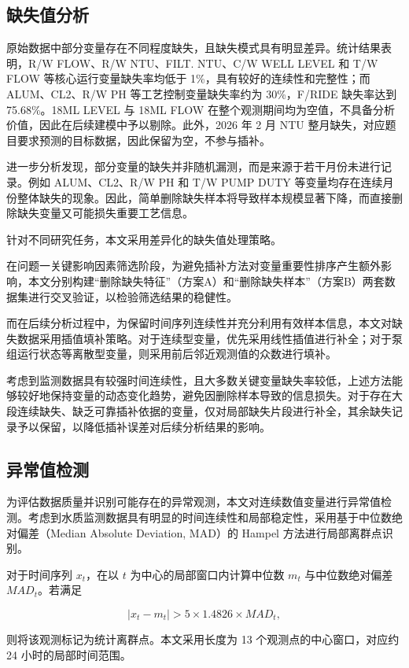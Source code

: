 \documentclass[UTF8,zihao=-4]{ctexart}
\begin{document}
\subsection{缺失值分析}

原始数据中部分变量存在不同程度缺失，且缺失模式具有明显差异。统计结果表明，R/W FLOW、R/W NTU、FILT. NTU、C/W WELL LEVEL 和 T/W FLOW 等核心运行变量缺失率均低于 1\%，具有较好的连续性和完整性；而 ALUM、CL2、R/W PH 等工艺控制变量缺失率约为 30\%，F/RIDE 缺失率达到 75.68\%。18ML LEVEL 与 18ML FLOW 在整个观测期间均为空值，不具备分析价值，因此在后续建模中予以剔除。此外，2026 年 2 月 NTU 整月缺失，对应题目要求预测的目标数据，因此保留为空，不参与插补。

进一步分析发现，部分变量的缺失并非随机漏测，而是来源于若干月份未进行记录。例如 ALUM、CL2、R/W PH 和 T/W PUMP DUTY 等变量均存在连续月份整体缺失的现象。因此，简单删除缺失样本将导致样本规模显著下降，而直接删除缺失变量又可能损失重要工艺信息。

针对不同研究任务，本文采用差异化的缺失值处理策略。

在问题一关键影响因素筛选阶段，为避免插补方法对变量重要性排序产生额外影响，本文分别构建“删除缺失特征”（方案A）和“删除缺失样本”（方案B）两套数据集进行交叉验证，以检验筛选结果的稳健性。

而在后续分析过程中，为保留时间序列连续性并充分利用有效样本信息，本文对缺失数据采用插值填补策略。对于连续型变量，优先采用线性插值进行补全；对于泵组运行状态等离散型变量，则采用前后邻近观测值的众数进行填补。

考虑到监测数据具有较强时间连续性，且大多数关键变量缺失率较低，上述方法能够较好地保持变量的动态变化趋势，避免因删除样本导致的信息损失。对于存在大段连续缺失、缺乏可靠插补依据的变量，仅对局部缺失片段进行补全，其余缺失记录予以保留，以降低插补误差对后续分析结果的影响。


\subsection{异常值检测}

为评估数据质量并识别可能存在的异常观测，本文对连续数值变量进行异常值检测。考虑到水质监测数据具有明显的时间连续性和局部稳定性，采用基于中位数绝对偏差（Median Absolute Deviation, MAD）的 Hampel 方法进行局部离群点识别。

对于时间序列 $x_t$，在以 $t$ 为中心的局部窗口内计算中位数 $m_t$ 与中位数绝对偏差 $MAD_t$。若满足

\[
|x_t-m_t|>5\times1.4826\times MAD_t,
\]

则将该观测标记为统计离群点。本文采用长度为 13 个观测点的中心窗口，对应约 24 小时的局部时间范围。
\end{document}
